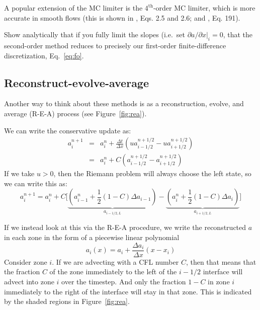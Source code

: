 A popular extension of the MC limiter is the $4^\mathrm{th}$-order MC
limiter, which is more accurate in smooth flows (this is shown in
\cite{colella:1985}, Eqs. 2.5 and 2.6; and \cite{colella:1990},
Eq. 191).

\begin{exercise}
{Show analytically that if you fully limit the slopes
  (i.e.\ set $\partial a/\partial x |_i = 0$, that the second-order
  method reduces to precisely our first-order finite-difference discretization,
  Eq.~\ref{eq:fo}.  }
\end{exercise}


\subsection{Reconstruct-evolve-average}

Another way to think about these methods is as a reconstruction,
evolve, and average (R-E-A) process (see Figure~\ref{fig:rea}).  

We can write the conservative update as:
\begin{eqnarray}
a_i^{n+1} &=& a_i^n + \frac{\Delta t}{\Delta x} 
    (u a^{n+1/2}_{i-1/2} - u a^{n+1/2}_{i+1/2} ) \\
          &=& a_i^n + C (a^{n+1/2}_{i-1/2} - a^{n+1/2}_{i+1/2} ) 
\end{eqnarray}
If we take $u > 0$, then the Riemann problem will always choose the
left state, so we can write this as:
\begin{equation}
a_i^{n+1} = a_i^n + 
     C \biggl [\underbrace{\left (a_{i-1}^n + \frac{1}{2} (1-C) \Delta a_{i-1} \right )}_{a_{i-1/2,L}} -
              \underbrace{\left (a_{i}^n + \frac{1}{2} (1-C) \Delta a_{i} \right )}_{a_{i+1/2,L}}
       \biggr ] \label{eq:rea_orig}
\end{equation}

If we instead look at this via the R-E-A procedure, we write the reconstructed
$a$ in each zone in the form of a piecewise linear polynomial
\begin{equation}
a_i(x) = a_i + \frac{\Delta a_i}{\Delta x} (x - x_i)
\end{equation}
Consider zone $i$.  
If we are advecting with a CFL number $C$, then that means that the fraction
$C$ of the zone immediately to the left of the $i-1/2$ interface will advect
into zone $i$ over the timestep.  And only the fraction $1-C$ in zone $i$
immediately to the right of the interface will stay in that zone.  This 
is indicated by the shaded regions in Figure~\ref{fig:rea}. 

